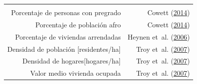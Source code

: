 \documentclass[12pt,a4paper,oneside, openany]{book}
\theoremstyle{definition}
\theoremstyle{definition}
\theoremstyle{definition}
\theoremstyle{remark}
\begin{document}
\begin{longtable}[]{@{}rr@{}}
\begin{minipage}[t]{0.31\columnwidth}
\end{minipage}\tabularnewline
\begin{minipage}[t]{0.57\columnwidth}\raggedleft\strut
Porcentaje de personas con pregrado\strut
\end{minipage} & \begin{minipage}[t]{0.31\columnwidth}\raggedleft\strut
Cowett (\protect\hyperlink{ref-cowett_methodology_2014}{2014})\strut
\end{minipage}\tabularnewline
\begin{minipage}[t]{0.57\columnwidth}\raggedleft\strut
Porcentaje de población afro\strut
\end{minipage} & \begin{minipage}[t]{0.31\columnwidth}\raggedleft\strut
Cowett (\protect\hyperlink{ref-cowett_methodology_2014}{2014})\strut
\end{minipage}\tabularnewline
\begin{minipage}[t]{0.57\columnwidth}\raggedleft\strut
Porcentaje de viviendas arrendadas\strut
\end{minipage} & \begin{minipage}[t]{0.31\columnwidth}\raggedleft\strut
Heynen et~al.
(\protect\hyperlink{ref-heynen_political_2006}{2006})\strut
\end{minipage}\tabularnewline
\begin{minipage}[t]{0.57\columnwidth}\raggedleft\strut
Densidad de población {[}residentes/ha{]}\strut
\end{minipage} & \begin{minipage}[t]{0.31\columnwidth}\raggedleft\strut
Troy et~al. (\protect\hyperlink{ref-troy_predicting_2007}{2007})\strut
\end{minipage}\tabularnewline
\begin{minipage}[t]{0.57\columnwidth}\raggedleft\strut
Densidad de hogares{[}hogares/ha{]}\strut
\end{minipage} & \begin{minipage}[t]{0.31\columnwidth}\raggedleft\strut
Troy et~al. (\protect\hyperlink{ref-troy_predicting_2007}{2007})\strut
\end{minipage}\tabularnewline
\begin{minipage}[t]{0.57\columnwidth}\raggedleft\strut
Valor medio vivienda ocupada\strut
\end{minipage} & \begin{minipage}[t]{0.31\columnwidth}\raggedleft\strut
Troy et~al. (\protect\hyperlink{ref-troy_predicting_2007}{2007})\strut
\end{minipage}\tabularnewline

\end{longtable}
\end{document}
